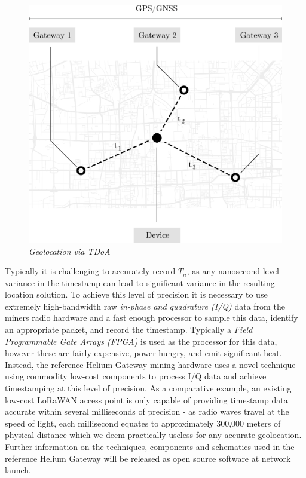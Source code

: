 \documentclass[UTF8, 10pt, nonatbib, nocopyrightspace, reprint]{sigplanconf}
\begin{document}
\begin{figure}[H]
    \begin{center}
          \includegraphics[width=\columnwidth]{tdoa.eps}
          \caption{\emph{Geolocation via TDoA}}
          \label{fig:tdoa}
     \end{center}
\end{figure}

Typically it is challenging to accurately record $T_n$, as any nanosecond-level variance in the timestamp can lead to significant variance in the resulting location solution. To achieve this level of precision it is necessary to use extremely high-bandwidth raw \emph{in-phase and quadrature (I/Q)} data from the miners radio hardware and a fast enough processor to sample this data, identify an appropriate packet, and record the timestamp. Typically a \emph{Field Programmable Gate Arrays (FPGA)} is used as the processor for this data, however these are fairly expensive, power hungry, and emit significant heat. Instead, the reference Helium Gateway mining hardware uses a novel technique using commodity low-cost components to process I/Q data and achieve timestamping at this level of precision. As a comparative example, an existing low-cost LoRaWAN \cite{lorawan} access point is only capable of providing timestamp data accurate within several milliseconds of precision - as radio waves travel at the speed of light, each millisecond equates to approximately 300,000 meters of physical distance which we deem practically useless for any accurate geolocation. Further information on the techniques, components and schematics used in the reference Helium Gateway will be released as open source software at network launch. 
\end{document}
